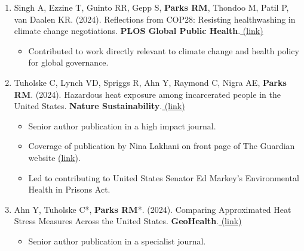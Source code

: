 \begin{enumerate}
    \item Singh A, Ezzine T, Guinto RR, Gepp S, \textbf{Parks RM}, Thondoo M, Patil P, van Daalen KR. (2024). Reflections from COP28: Resisting healthwashing in climate change negotiations. \textbf{PLOS Global Public Health}.\href{https://journals.PLOS.org/globalpublichealth/article?id=10.1371/journal.pgph.0003076}{ (link)}

    \begin{itemize}
        \item Contributed to work directly relevant to climate change and health policy for global governance.
    \end{itemize}

    \item Tuholske C, Lynch VD, Spriggs R, Ahn Y, Raymond C, Nigra AE, \textbf{Parks RM}. (2024). Hazardous heat exposure among incarcerated people in the United States. \textbf{Nature Sustainability}.\href{https://www.nature.com/articles/s41893-024-01293-y}{ (link)}

    \begin{itemize}
        \item Senior author publication in a high impact journal.
            \item Coverage of publication by Nina Lakhani on front page of The Guardian website \href{https://www.theguardian.com/us-news/2024/mar/05/prisons-heat-deaths-texas-florida}{(link)}.
            \item Led to contributing to United States Senator Ed Markey's Environmental Health in Prisons Act. 
    \end{itemize}

    \item \noindent Ahn Y, Tuholske C*, \textbf{Parks RM}*. (2024). Comparing Approximated Heat Stress Measures Across the United States. \textbf{GeoHealth}.\href{https://agupubs.onlinelibrary.wiley.com/doi/10.1029/2023GH000923}{ (link)}

\begin{itemize}
    \item Senior author publication in a specialist journal.
\end{itemize}

\newpage


\end{enumerate}

